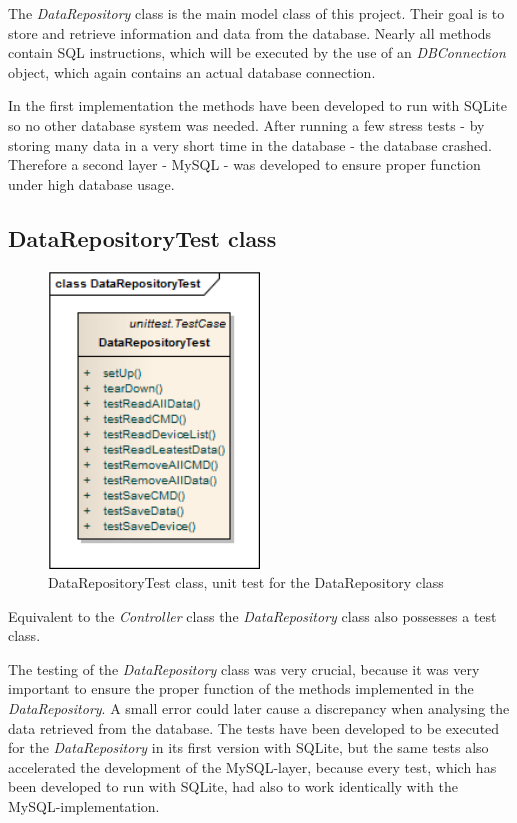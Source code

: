 The \textit{DataRepository} class is the main model class of this project. 
Their goal is to store and retrieve information and data from the database. 
Nearly all methods contain SQL instructions, 
which will be executed by the use of an \textit{DBConnection} object, which again contains an actual database connection.

In the first implementation the methods have been developed to run with SQLite so no other database system was needed. After running a few stress tests - by storing many data in a very short time in the database - the database crashed. Therefore a second layer - MySQL - was developed to ensure proper function under high database usage.

\newpage
\subsection{DataRepositoryTest class}
\begin{figure}[H]
   \centering
   \includegraphics[width=0.5\textwidth]{pic/DataRepositoryTest.png}%
   \caption{DataRepositoryTest class, unit test for the DataRepository class}
   \label{DataRepositoryTestpic}%
\end{figure}

Equivalent to the \textit{Controller} class the \textit{DataRepository} class also possesses a test class.

The testing of the \textit{DataRepository} class was very crucial, because it was very important to ensure the proper function of the methods implemented in the \textit{DataRepository}. A small error could later cause a discrepancy when analysing the data retrieved from the database. 
The tests have been developed to be executed for the \textit{DataRepository} in its first version with SQLite, but the same tests also accelerated the development of the MySQL-layer, because every test, which has been developed to run with SQLite, had also to work identically with the MySQL-implementation.

